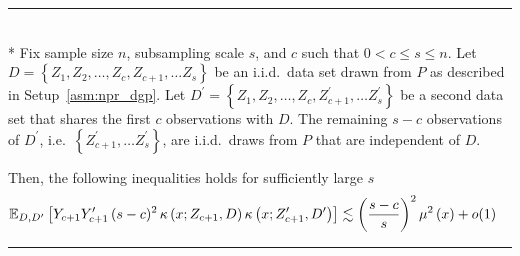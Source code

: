 \hrule

\begin{lem}\label{lem:npr_kern_ineq3}\mbox{}\\*
	Fix sample size $n$, subsampling scale $s$, and $c$ such that $0 < c \leq s \leq n$.
	Let $D = \left\{Z_1, Z_2, \dotsc, Z_c, Z_{c+1}, \dotsc Z_s \right\}$ be an i.i.d.\ data set drawn from $P$ as described in Setup~\ref{asm:npr_dgp}.
	Let $D^{\prime} = \left\{Z_1, Z_2, \dotsc, Z_c, Z_{c+1}^{\prime}, \dotsc Z_s^{\prime} \right\}$ be a second data set that shares the first $c$ observations with $D$.
	The remaining $s - c$ observations of $D^{\prime}$, i.e.\ $\left\{Z_{c+1}^{\prime}, \dotsc Z_s^{\prime} \right\}$, are i.i.d.\ draws from $P$ that are independent of $D$.

	Then, the following inequalities holds for sufficiently large $s$
	\begin{equation}
		\begin{aligned}
			\mathbb{E}_{D, D^{\prime}}\left[Y_{c+1}Y_{c+1}^{\prime} \, (s-c)^2 \, \kappa\left(x; Z_{c+1}, D\right)\kappa\left(x; Z_{c+1}^{\prime}, D^{\prime}\right)\right]
		 & \lesssim \left(\frac{s - c}{s}\right)^{2} \mu^{2}\left(x\right) + o(1)
		\end{aligned}
	\end{equation}
\end{lem}

\hrule

